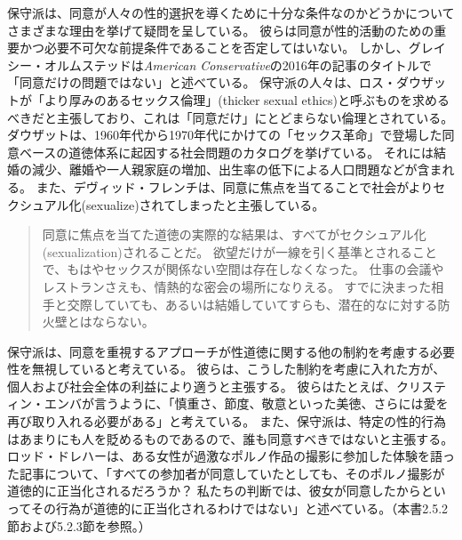 \documentclass[paper=a4,book,openany]{jlreq}
\newcommand{\ig}[1]{}           %
\begin{document}
保守派は、同意が人々の性的選択を導くために十分な条件なのかどうかについてさまざまな理由を挙げて疑問を呈している。
彼らは同意が性的活動のための重要かつ必要不可欠な前提条件であることを否定してはいない。
しかし、グレイシー・オルムステッドは\emph{American Conservative}の2016年の記事のタイトルで「同意だけの問題ではない」と述べている\citep{olmstead16:_its_not_just_consen}。
保守派の人々は、ロス・ダウザットが「より厚みのあるセックス倫理」(thicker sexual ethics)と呼ぶものを求めるべきだと主張しており、これは「同意だけ」にとどまらない倫理とされている\citep{douthat17:_age_consen_its_discon}。
ダウザットは、1960年代から1970年代にかけての「セックス革命」で登場した同意ベースの道徳体系に起因する社会問題のカタログを挙げている。
それには結婚の減少、離婚や一人親家庭の増加、出生率の低下による人口問題などが含まれる。
また、デヴィッド・フレンチ\ig{David French}は、同意に焦点を当てることで社会がよりセクシュアル化(sexualize)されてしまったと主張している。

\begin{quote}
同意に焦点を当てた道徳の実際的な結果は、すべてがセクシュアル化(sexualization)されることだ。
欲望だけが一線を引く基準とされることで、もはやセックスが関係ない空間は存在しなくなった。
仕事の会議やレストランさえも、情熱的な密会の場所になりえる。
すでに決まった相手と交際していても、あるいは結婚していてすらも、潜在的なに対する防火壁とはならない。
\citep{french17:_its_past_time}
\end{quote}

保守派は、同意を重視するアプローチが性道徳に関する他の制約を考慮する必要性を無視していると考えている。
彼らは、こうした制約を考慮に入れた方が、個人および社会全体の利益により適うと主張する。
彼らはたとえば、クリスティン・エンバが言うように、「慎重さ、節度、敬意といった美徳、さらには愛を再び取り入れる必要がある」と考えている\citep{emba17:_lets_rethin_sex}。
また、保守派は、特定の性的行為はあまりにも人を貶めるものであるので、誰も同意すべきではないと主張する。
ロッド・ドレハー\ig{Rod Dreher}は、ある女性が過激なポルノ作品の撮影に参加した体験を語った記事について、「すべての参加者が同意していたとしても、そのポルノ撮影が道徳的に正当化されるだろうか？ 私たちの判断では、彼女が同意したからといってその行為が道徳的に正当化されるわけではない」と述べている\citep{dreher13:_porn_cultur_consen}。（本書2.5.2節および5.2.3節を参照。）
\end{document}
